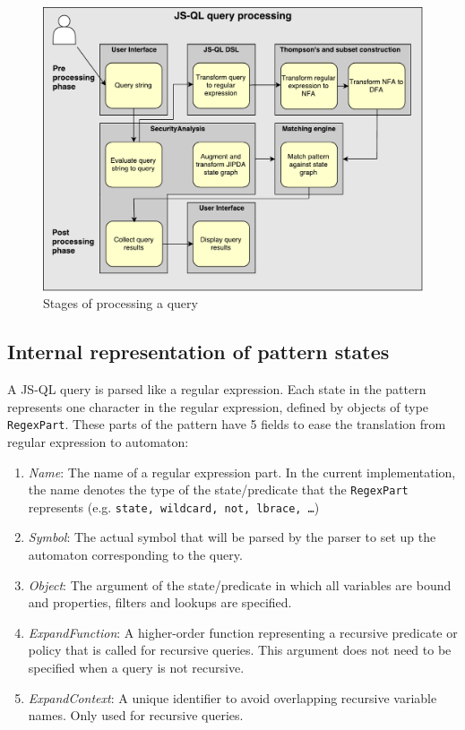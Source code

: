 \begin{figure}[!h]
    \centering
      \includegraphics[width=1\textwidth]{images/QueryProcessing} 
      \caption{Stages of processing a query}
    \label{fig:QueryProcessing}
\end{figure}

\subsection*{Internal representation of pattern states}

A JS-QL query is parsed like a regular expression. Each state in the pattern represents one character in the regular expression, defined by objects of type \texttt{RegexPart}. These parts of the pattern have 5 fields to ease the translation from regular expression to automaton:
\begin{enumerate}
\item \textit{Name}: The name of a regular expression part. In the current implementation, the name denotes the type of the state/predicate that the \texttt{RegexPart} represents (e.g. \texttt{state, wildcard, not, lbrace, \ldots})
\item \textit{Symbol}: The actual symbol that will be parsed by the parser to set up the automaton corresponding to the query.
\item \textit{Object}: The argument of the state/predicate in which all variables are bound and properties, filters and lookups are specified.
\item \textit{ExpandFunction}: A higher-order function representing a recursive predicate or policy that is called for recursive queries. This argument does not need to be specified when a query is not recursive.
\item \textit{ExpandContext}: A unique identifier to avoid overlapping recursive variable names. Only used for recursive queries.
\end{enumerate}

